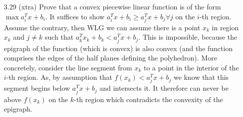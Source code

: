\documentclass[12pt]{article}
\begin{document}
\begin{itemize}
\item[3.29 (xtra)] Prove that a convex piecewise linear function is of the form $\max a_i^Tx + b_i$.
  It suffices to show $a_i^T x + b_i \geq a_j^T x + b_j \forall j$ on the $i$-th region. Assume the contrary, then WLG we can assume there is a point $x_k$ in region $x_k$ and $j \neq k$ such that $a_k^T x_k + b_k < a_j^T x + b_j$. This is impossible, because the epigraph of the function (which is convex) is also convex (and the function comprises the edges of the half planes defining the polyhedron). More concretely, consider the line segment from $x_k$ to a point in the interior of the $i$-th region. As, by assumption that $f(x_k) < a_j^T x + b_j$ we know that this segment begins below $a_j^T x + b_j$ and intersects it. It therefore can never be above $f(x_k)$ on the $k$-th region which contradicts the convexity of the epigraph.
\end{itemize}
\end{document}
